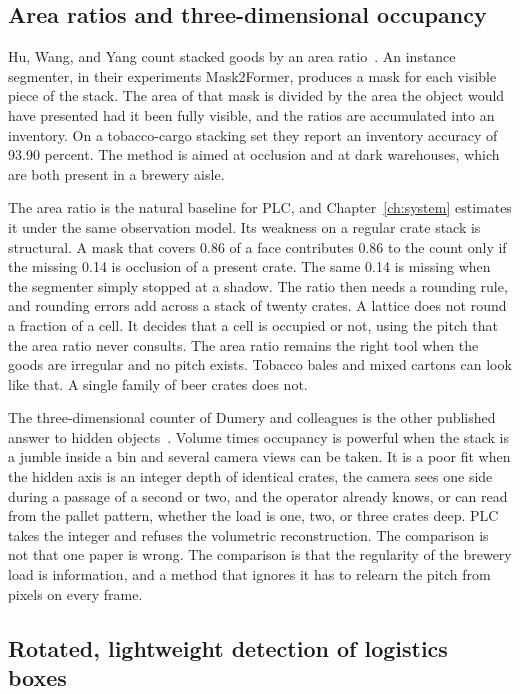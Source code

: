\subsection{Area ratios and three-dimensional occupancy}
\label{sec:area-and-3d}

Hu, Wang, and Yang count stacked goods by an area ratio~\cite{hu2025arbca}. An instance segmenter, in their experiments Mask2Former, produces a mask for each visible piece of the stack. The area of that mask is divided by the area the object would have presented had it been fully visible, and the ratios are accumulated into an inventory. On a tobacco-cargo stacking set they report an inventory accuracy of 93.90 percent. The method is aimed at occlusion and at dark warehouses, which are both present in a brewery aisle.

The area ratio is the natural baseline for PLC, and Chapter~\ref{ch:system} estimates it under the same observation model. Its weakness on a regular crate stack is structural. A mask that covers 0.86 of a face contributes 0.86 to the count only if the missing 0.14 is occlusion of a present crate. The same 0.14 is missing when the segmenter simply stopped at a shadow. The ratio then needs a rounding rule, and rounding errors add across a stack of twenty crates. A lattice does not round a fraction of a cell. It decides that a cell is occupied or not, using the pitch that the area ratio never consults. The area ratio remains the right tool when the goods are irregular and no pitch exists. Tobacco bales and mixed cartons can look like that. A single family of beer crates does not.

The three-dimensional counter of Dumery and colleagues is the other published answer to hidden objects~\cite{dumery2024stacked}. Volume times occupancy is powerful when the stack is a jumble inside a bin and several camera views can be taken. It is a poor fit when the hidden axis is an integer depth of identical crates, the camera sees one side during a passage of a second or two, and the operator already knows, or can read from the pallet pattern, whether the load is one, two, or three crates deep. PLC takes the integer and refuses the volumetric reconstruction. The comparison is not that one paper is wrong. The comparison is that the regularity of the brewery load is information, and a method that ignores it has to relearn the pitch from pixels on every frame.

\subsection{Rotated, lightweight detection of logistics boxes}
\label{sec:rew}

